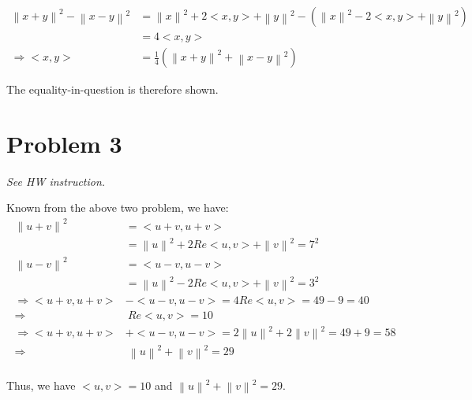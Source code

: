 \documentclass[11pt]{article}
\providecommand{\norm}[1]{\left\lVert #1 \right\rVert}
\begin{document}
\begin{align*}
    \norm{x + y}^2 - \norm{x - y}^2 &= \norm{x}^2 + 2<x, y> + \norm{y}^2  - (\norm{x}^2 - 2<x, y> + \norm{y}^2) \\
    &= 4<x, y> \\
    \Longrightarrow <x, y> &= \frac{1}{4}(\norm{x + y}^2 + \norm{x - y}^2)
\end{align*}

The equality-in-question is therefore shown.

\section*{Problem 3}
\textit{See HW instruction.}\newline

Known from the above two problem, we have:
\begin{align*}
    \norm{u + v}^2 &= <u + v, u + v> \\
    &= \norm{u}^2 + 2 Re<u, v> + \norm{v}^2 = 7^2 \\
    \norm{u - v}^2 &= <u - v, u - v> \\
    &= \norm{u}^2 - 2 Re<u, v> + \norm{v}^2 = 3^2 \\
    \Rightarrow <u + v, u + v> &- <u - v, u - v> = 4 Re <u, v> = 49 - 9 = 40 \\
    \Longrightarrow& \ Re<u, v> = 10 \\
    \Rightarrow <u + v, u + v> &+ <u - v, u - v> = 2\norm{u}^2 + 2\norm{v}^2 = 49 + 9 = 58 \\
    \Longrightarrow& \ \norm{u}^2 + \norm{v}^2 = 29 \\
\end{align*}

Thus, we have $<u, v> = 10$ and $\norm{u}^2 + \norm{v}^2 = 29$.
\end{document}
